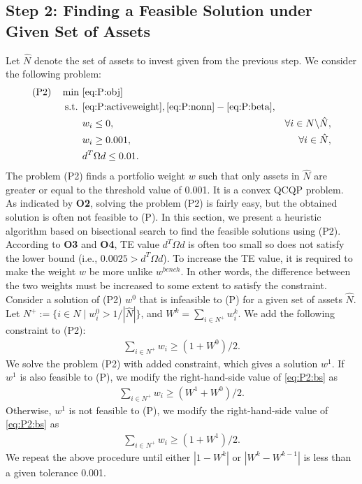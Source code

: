 \documentclass[11pt]{article}
\begin{document}
	
	
	\subsection{Step 2: Finding a Feasible Solution under Given Set of Assets}
	
	Let $\hat{N}$ denote the set of assets to invest given from the previous step. We consider the following problem:
	\begin{align*}
	\text{(P2)} \quad \min~ &\eqref{eq:P:obj}\\
	\text{s.t. } 
	& \eqref{eq:P:activeweight}, \eqref{eq:P:nonn} - \eqref{eq:P:beta}, \notag\\
	& w_i \le 0, & \forall i \in N \backslash \hat{N}, \\
	& w_i \geq 0.001, & \forall i \in \hat{N}, \\
	& d^T \Omega d \leq 0.01. & 
	\end{align*} 
	The problem (P2) finds a portfolio weight $w$ such that only assets in $\hat{N}$ are greater or equal to the threshold value of 0.001. It is a convex QCQP problem. As indicated by \textbf{O2}, solving the problem (P2) is fairly easy, but the obtained solution is often not feasible to (P). In this section, we present a heuristic algorithm based on bisectional search to find the feasible solutions using (P2). According to \textbf{O3} and \textbf{O4}, TE value $d^T \Omega d$ is often too small so does not satisfy the lower bound (i.e., $0.0025 > d^T \Omega d$). To increase the TE value, it is required to make the weight $w$ be more unlike $w^{bench}$. In other words, the difference between the two weights must be increased to some extent to satisfy the constraint. Consider a solution of (P2) $w^0$ that is infeasible to (P) for a given set of assets $\hat{N}$. Let $N^+ := \{i \in N \mid w^0_i > 1/|\hat{N}| \}$, and $W^k = \sum_{i \in N^+} w^k_i$. We add the following constraint to (P2):
	\begin{align}
	\sum_{i \in N^+} w_i \ge (1+W^0)/2. \label{eq:P2:bs}
	\end{align}
	We solve the problem (P2) with added constraint, which gives a solution $w^1$. If $w^1$ is also feasible to (P), we modify the right-hand-side value of \eqref{eq:P2:bs} as
	\begin{align*}
	\sum_{i \in N^+} w_i \ge (W^1+W^0)/2.
	\end{align*}
	Otherwise, $w^1$ is not feasible to (P), we modify the right-hand-side value of \eqref{eq:P2:bs} as
	\begin{align*}
	\sum_{i \in N^+} w_i \ge (1+W^1)/2.
	\end{align*}
	We repeat the above procedure until either $|1-W^k|$ or $|W^k-W^{k-1}|$ is less than a given tolerance 0.001. 
	
\end{document}
